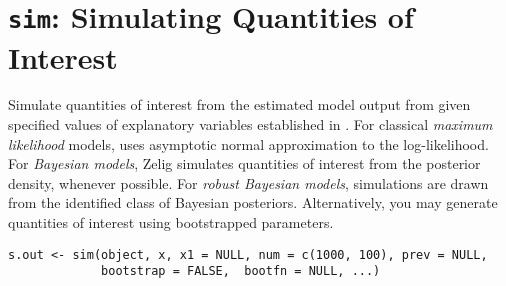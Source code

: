  \section{{\tt sim}: Simulating Quantities of Interest}\label{ss:sim}
\begin{Description}\relax
Simulate quantities of interest from the estimated model
output from  given specified values of explanatory
variables established in .  For classical \emph{maximum
likelihood} models,  uses asymptotic normal
approximation to the log-likelihood.  For \emph{Bayesian models},
Zelig simulates quantities of interest from the posterior density,
whenever possible.  For \emph{robust Bayesian models}, simulations
are drawn from the identified class of Bayesian posteriors.
Alternatively, you may generate quantities of interest using
bootstrapped parameters.
\end{Description}
\begin{Usage}
\begin{verbatim}
s.out <- sim(object, x, x1 = NULL, num = c(1000, 100), prev = NULL, 
             bootstrap = FALSE,  bootfn = NULL, ...)
\end{verbatim}
\end{Usage}
